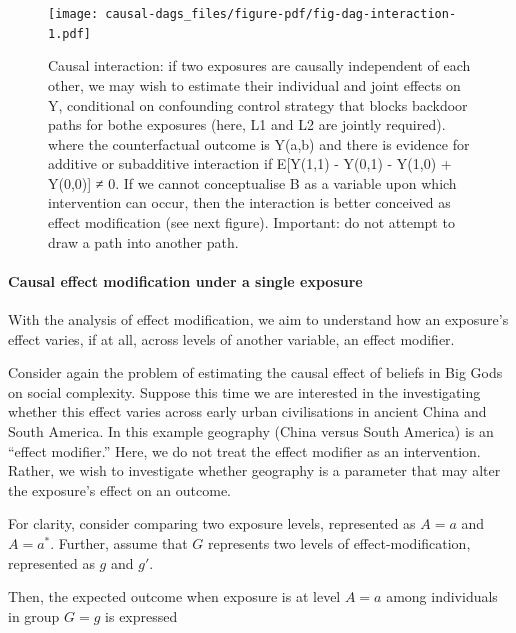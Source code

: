 \documentclass[
  singlecolumn,
  9pt]{article}
\let\oldparagraph\paragraph
\renewcommand{\paragraph}[1]{\oldparagraph{#1}\mbox{}}
\begin{document}
\begin{figure}

{\centering \texttt{[image: causal-dags\_files/figure-pdf/fig-dag-interaction-1.pdf]}

}

\caption{\label{fig-dag-interaction}Causal interaction: if two exposures
are causally independent of each other, we may wish to estimate their
individual and joint effects on Y, conditional on confounding control
strategy that blocks backdoor paths for bothe exposures (here, L1 and L2
are jointly required). where the counterfactual outcome is Y(a,b) and
there is evidence for additive or subadditive interaction if E{[}Y(1,1)
- Y(0,1) - Y(1,0) + Y(0,0){]} ≠ 0. If we cannot conceptualise B as a
variable upon which intervention can occur, then the interaction is
better conceived as effect modification (see next figure). Important: do
not attempt to draw a path into another path.}

\end{figure}

\paragraph{\texorpdfstring{\textbf{Causal effect modification under a
single
exposure}}{Causal effect modification under a single exposure}}\label{causal-effect-modification-under-a-single-exposure}

With the analysis of effect modification, we aim to understand how an
exposure's effect varies, if at all, across levels of another variable,
an effect modifier.

Consider again the problem of estimating the causal effect of beliefs in
Big Gods on social complexity. Suppose this time we are interested in
the investigating whether this effect varies across early urban
civilisations in ancient China and South America. In this example
geography (China versus South America) is an ``effect modifier.'' Here,
we do not treat the effect modifier as an intervention. Rather, we wish
to investigate whether geography is a parameter that may alter the
exposure's effect on an outcome.

For clarity, consider comparing two exposure levels, represented as
\(A = a\) and \(A= a^*\). Further, assume that \(G\) represents two
levels of effect-modification, represented as \(g\) and \(g'\).

Then, the expected outcome when exposure is at level \(A=a\) among
individuals in group \(G=g\) is expressed
\end{document}
